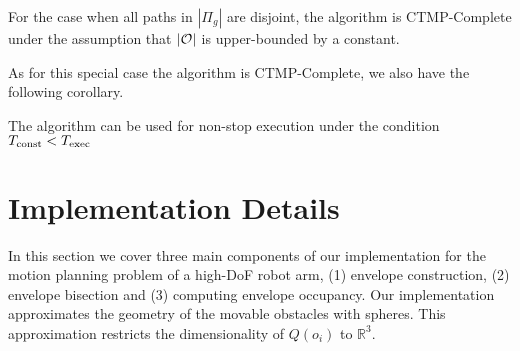 \documentclass[a4paper]{report}
\begin{document}
\vspace{2mm}
\begin{theorem}
	For the case when all paths in $|\Pi_g|$ are disjoint, the algorithm is CTMP-Complete under the assumption that $|\mathcal{O}|$ is upper-bounded by a constant.
\end{theorem}

As for this special case the algorithm is CTMP-Complete, we also have the following corollary.

\vspace{2mm}
\begin{cor}
	The algorithm can be used for non-stop execution under the condition~$T_{\textrm{const}} < T_{\textrm{exec}}$
\end{cor}

\section{Implementation Details} %
In this section we cover three main components of our implementation for the motion planning problem of a high-DoF robot arm, (1) envelope construction, (2) envelope bisection and (3) computing envelope occupancy.
%
Our implementation approximates the geometry of the movable obstacles with spheres. This approximation restricts the dimensionality of $Q(o_i)$ to $\mathbb{R}^3$.
\end{document}

